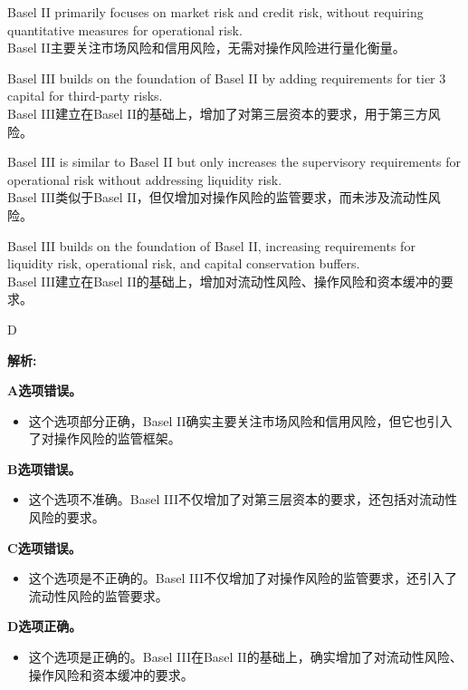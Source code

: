 \documentclass{article}
\newenvironment{explanation}
{\textbf{解析:}\par}
{\par}
\begin{document}
            \begin{choices}
            \item Basel II primarily focuses on market risk and credit risk, without requiring quantitative measures for operational risk. \\
            Basel II主要关注市场风险和信用风险，无需对操作风险进行量化衡量。
            
            \item Basel III builds on the foundation of Basel II by adding requirements for tier 3 capital for third-party risks. \\
            Basel III建立在Basel II的基础上，增加了对第三层资本的要求，用于第三方风险。
            \item Basel III is similar to Basel II but only increases the supervisory requirements for operational risk without addressing liquidity risk.\\
            Basel III类似于Basel II，但仅增加对操作风险的监管要求，而未涉及流动性风险。
            \item Basel III builds on the foundation of Basel II, increasing requirements for liquidity risk, operational risk, and capital conservation buffers. \\
            Basel III建立在Basel II的基础上，增加对流动性风险、操作风险和资本缓冲的要求。
            \end{choices}
            
            \begin{correctanswer}
            D
            \end{correctanswer}
            
            \begin{explanation}
            \textbf{A选项错误。}
            \begin{itemize}
                \item 这个选项部分正确，Basel II确实主要关注市场风险和信用风险，但它也引入了对操作风险的监管框架。
            \end{itemize}
            
            \textbf{B选项错误。}
            \begin{itemize}
                \item 这个选项不准确。Basel III不仅增加了对第三层资本的要求，还包括对流动性风险的要求。
            \end{itemize}
            
            \textbf{C选项错误。}
            \begin{itemize}
                \item 这个选项是不正确的。Basel III不仅增加了对操作风险的监管要求，还引入了流动性风险的监管要求。
            \end{itemize}
            
            \textbf{D选项正确。}
            \begin{itemize}
                \item 这个选项是正确的。Basel III在Basel II的基础上，确实增加了对流动性风险、操作风险和资本缓冲的要求。
            \end{itemize}
            \end{explanation}
            
\end{document}
